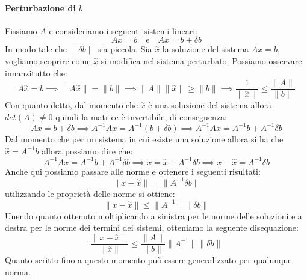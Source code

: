 \paragraph{Perturbazione di $b$}
Fissiamo $A$ e consideriamo i seguenti sistemi lineari:
\begin{equation*}
    Ax=b \quad \text{e} \quad Ax=b+\delta b
\end{equation*}
In modo tale che $\|\delta b\|$ sia piccola. Sia $\stackrel{\sim }{x}$ la soluzione
del sistema $Ax=b$, vogliamo scoprire come $\stackrel{\sim}{x}$ si modifica nel
sistema perturbato. Possiamo osservare innanzitutto che:
\begin{equation}
    A\stackrel{\sim}{x}=b \implies \|A\stackrel{\sim}{x}\|=\|b\|\implies \|A\|\|
    \stackrel{\sim}{x}\|\geq \|b\|\implies\frac{1}{\|\stackrel{\sim}{x}\|} \leq \frac{\|A\|}{\|b\|}
\end{equation}
Con quanto detto, dal momento che $\stackrel{\sim}{x}$ è una soluzione del sistema
allora $det(A) \neq 0$ quindi la matrice è invertibile, di conseguenza:
\begin{equation}
    Ax = b + \delta b \implies A^{-1} Ax = A^{-1}(b + \delta b) \implies A^{-1}
    Ax = A^{-1} b + A^{-1} \delta b
\end{equation}
Dal momento che per un sistema in cui esiste una soluzione allora si ha che
$\stackrel{\sim}{x}= A^{-1}b$ allora possiamo dire che:
\begin{equation}
    A^{-1}Ax = A^{-1}b+A^{-1}\delta b\implies x = \stackrel{\sim}{x}+A^{-1}\delta
    b\implies x - \stackrel{\sim}{x} = A^{-1}\delta b
\end{equation}
Anche qui possiamo passare alle norme e ottenere i seguenti risultati:
\begin{equation}
    \|x - \stackrel{\sim}{x} \| = \|A^{-1}\delta b\|
\end{equation}
utilizzando le proprietà delle norme si ottiene:
\begin{equation}
    \|x - \stackrel{\sim}{x} \| \leq \|A^{-1}\|\|\delta b\|
\end{equation}
Unendo quanto ottenuto moltiplicando a sinistra per le norme delle soluzioni e a
destra per le norme dei termini dei sistemi, otteniamo la seguente disequazione:
\begin{equation}
    \frac{\|x - \stackrel{\sim}{x}\|}{\|\stackrel{\sim}{x}\|} \leq \frac{\|A\|}{\|b\|}
    \|A^{-1}\|\|\delta b\|
\end{equation}
Quanto scritto fino a questo momento può essere generalizzato per qualunque norma.

